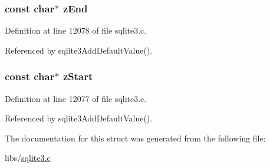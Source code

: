 \subsubsection[{z\+End}]{\setlength{\rightskip}{0pt plus 5cm}const char$\ast$ z\+End}\label{struct_expr_span_a92cfd0f58cabf6a41ef1173a73a6dc5c}


Definition at line 12078 of file sqlite3.\+c.



Referenced by sqlite3\+Add\+Default\+Value().

\hypertarget{struct_expr_span_a17ad559b98c2b8eb2c1a2ecb5d6d3016}{}
\subsubsection[{z\+Start}]{\setlength{\rightskip}{0pt plus 5cm}const char$\ast$ z\+Start}\label{struct_expr_span_a17ad559b98c2b8eb2c1a2ecb5d6d3016}


Definition at line 12077 of file sqlite3.\+c.



Referenced by sqlite3\+Add\+Default\+Value().



The documentation for this struct was generated from the following file\+:\begin{DoxyCompactItemize}
\item 
libs/\hyperlink{sqlite3_8c}{sqlite3.\+c}\end{DoxyCompactItemize}
